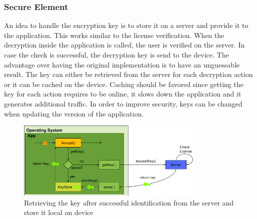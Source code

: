 \subsubsection{Secure Element} \label{section:counter-replace-encryption-key-online}
An idea to handle the encryption key is to store it on a server and provide it to the application.
This works similar to the license verification.
When the decryption inside the application is called, the user is verified on the server.
In case the check is successful, the decryption key is send to the device.
The advantage over having the original implementation is to have an unguessable result.
The key can either be retrieved from the server for each decryption action or it can be cached on the device.
Caching should be favored since getting the key for each action requires to be online, it slows down the application and it generates additional traffic.
In order to improve security, keys can be changed when updating the version of the application.
\begin{figure}[h]
    \centering
    \includegraphics[width=0.8\textwidth]{data/encryptionKeyServer.png}
    \caption{Retrieving the key after successful identification from the server and store it local on device}
    \label{fig:encryptionKeyServer}
\end{figure}
